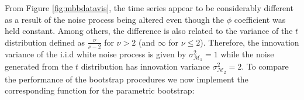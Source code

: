 \documentclass[]{book}
\newenvironment{Shaded}{\begin{snugshade}}{\end{snugshade}}
\newcommand{\CommentTok}[1]{\textcolor[rgb]{0.56,0.35,0.01}{\textit{#1}}}
\newcommand{\ControlFlowTok}[1]{\textcolor[rgb]{0.13,0.29,0.53}{\textbf{#1}}}
\newcommand{\DataTypeTok}[1]{\textcolor[rgb]{0.13,0.29,0.53}{#1}}
\newcommand{\DecValTok}[1]{\textcolor[rgb]{0.00,0.00,0.81}{#1}}
\newcommand{\KeywordTok}[1]{\textcolor[rgb]{0.13,0.29,0.53}{\textbf{#1}}}
\newcommand{\NormalTok}[1]{#1}
\newcommand{\OperatorTok}[1]{\textcolor[rgb]{0.81,0.36,0.00}{\textbf{#1}}}
\newcommand{\OtherTok}[1]{\textcolor[rgb]{0.56,0.35,0.01}{#1}}
\newcommand{\StringTok}[1]{\textcolor[rgb]{0.31,0.60,0.02}{#1}}
\theoremstyle{definition}
\theoremstyle{definition}
\theoremstyle{definition}
\theoremstyle{remark}
\begin{document}
From Figure \ref{fig:mbbdatavis}, the time series appear to be
considerably different as a result of the noise process being altered
even though the \(\phi\) coefficient was held constant. Among others,
the difference is also related to the variance of the \(t\) distribution
defined as \(\frac{\nu}{\nu-2}\) for \(\nu > 2\) (and \(\infty\) for
\(\nu \le 2\)). Therefore, the innovation variance of the i.i.d white
noise process is given by \(\sigma^2_{\mathcal{M}_1} = 1\) while the
noise generated from the \(t\) distribution has innovation variance
\(\sigma^2_{\mathcal{M}_2} = 2\). To compare the performance of the
bootstrap procedures we now implement the corresponding function for the
parametric bootstrap:

\begin{Shaded}
\end{Shaded}
\end{document}
